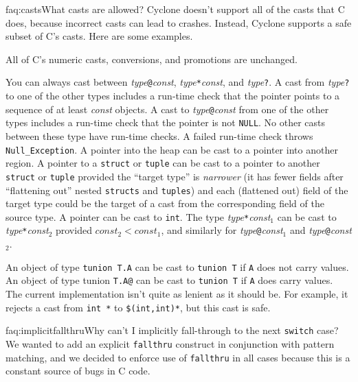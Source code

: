 \begin{faqa}{faq:casts}{What casts are allowed?}
Cyclone doesn't support all of the casts that C does, because
incorrect casts can lead to crashes.  Instead, Cyclone supports a safe
subset of C's casts.  Here are some examples.

All of C's numeric casts, conversions, and promotions are unchanged.

You can always cast between
\textit{type}\texttt{@}\lb\textit{const}\rb,
\textit{type}\texttt{*}\lb\textit{const}\rb, and
\textit{type}\texttt{?}.
A cast from 
\textit{type}\texttt{?}
to one of the other types includes a run-time check that the pointer
points to a sequence of at least \textit{const} objects.
A cast to
\textit{type}\texttt{@}\lb\textit{const}\rb
from one of the
other types includes a run-time check that the pointer is not
\texttt{NULL}.
No other casts between these type have run-time checks.
A failed run-time check throws \texttt{Null_Exception}.
A pointer into the heap can be cast to a pointer into another region.
A pointer to a \texttt{struct} or \texttt{tuple} can be
cast to a pointer to another \texttt{struct} or \texttt{tuple}
provided the ``target type'' 
is \emph{narrower} (it has fewer fields after ``flattening out'' nested
\texttt{structs} and \texttt{tuples}) and each (flattened out) field
of the target type could be the target of a cast from the
corresponding field of the source type.
A pointer can be cast to \texttt{int}.
The type
\textit{type}\texttt{*}\lb\textit{const}$_1$\rb
can be cast to
\textit{type}\texttt{*}\lb\textit{const}$_2$\rb
provided
$\textit{const}_2 < \textit{const}_1$, and similarly for
\textit{type}\texttt{@}\lb\textit{const}$_1$\rb
and
\textit{type}\texttt{@}\lb\textit{const}$_2$\rb.

An object of type \texttt{tunion T.A} can be cast to \texttt{tunion T}
if \texttt{A} does not carry values.  An object of type tunion
\texttt{T.A@} can be cast to \texttt{tunion T} if \texttt{A} does
carry values.  The current implementation isn't quite as lenient as it
should be.  For example, it rejects a cast from \texttt{int *\rb} to
\texttt{\$(int,int)*\rb}, but this cast is safe.
\end{faqa}

\begin{faqa}{faq:implicitfallthru}{Why can't I implicitly fall-through to the next \texttt{switch} case?}
We wanted to add an explicit \texttt{fallthru} construct in
conjunction with pattern matching, and we decided to enforce use of
\texttt{fallthru} in all cases because this is a constant source of
bugs in C code.
\end{faqa}

